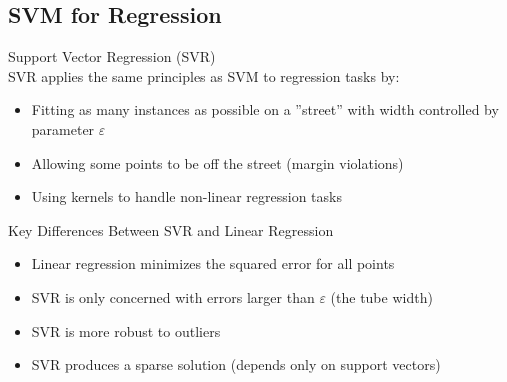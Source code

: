 \raggedcolumns
\columnbreak

\subsection{SVM for Regression}

\begin{definition}{Support Vector Regression (SVR)}\\
SVR applies the same principles as SVM to regression tasks by:
\begin{itemize}
    \item Fitting as many instances as possible on a ''street'' with width controlled by parameter $\varepsilon$
    \item Allowing some points to be off the street (margin violations)
    \item Using kernels to handle non-linear regression tasks
\end{itemize}
\end{definition}

\begin{concept}{Key Differences Between SVR and Linear Regression}
\begin{itemize}
    \item Linear regression minimizes the squared error for all points
    \item SVR is only concerned with errors larger than $\varepsilon$ (the tube width)
    \item SVR is more robust to outliers
    \item SVR produces a sparse solution (depends only on support vectors)
\end{itemize}
\end{concept}

